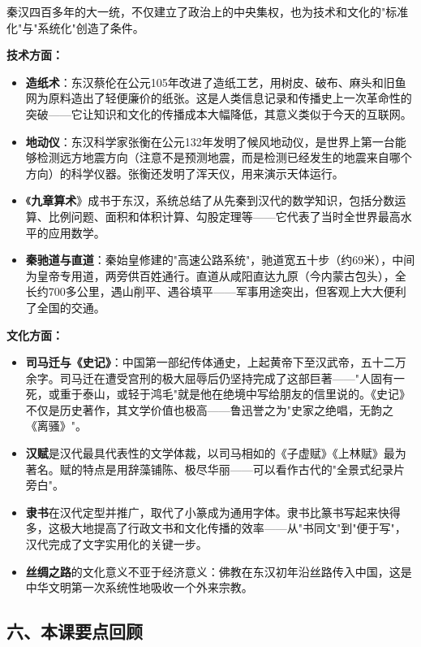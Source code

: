 \documentclass[a4paper,12pt]{ctexart}
\begin{document}
秦汉四百多年的大一统，不仅建立了政治上的中央集权，也为技术和文化的"标准化"与"系统化"创造了条件。

\textbf{技术方面：}
\begin{itemize}
  \item \textbf{造纸术}：东汉蔡伦在公元105年改进了造纸工艺，用树皮、破布、麻头和旧鱼网为原料造出了轻便廉价的纸张。这是人类信息记录和传播史上一次革命性的突破——它让知识和文化的传播成本大幅降低，其意义类似于今天的互联网。
  \item \textbf{地动仪}：东汉科学家张衡在公元132年发明了候风地动仪，是世界上第一台能够检测远方地震方向（注意\：不是预测地震，而是检测已经发生的地震来自哪个方向）的科学仪器。张衡还发明了浑天仪，用来演示天体运行。
  \item 《\textbf{九章算术}》成书于东汉，系统总结了从先秦到汉代的数学知识，包括分数运算、比例问题、面积和体积计算、勾股定理等——它代表了当时全世界最高水平的应用数学。
  \item \textbf{秦驰道与直道}：秦始皇修建的"高速公路系统"，驰道宽五十步（约69米），中间为皇帝专用道，两旁供百姓通行。直道从咸阳直达九原（今内蒙古包头），全长约700多公里，遇山削平、遇谷填平——军事用途突出，但客观上大大便利了全国的交通。
\end{itemize}

\textbf{文化方面：}
\begin{itemize}
  \item \textbf{司马迁与《史记》}：中国第一部纪传体通史，上起黄帝下至汉武帝，五十二万余字。司马迁在遭受宫刑的极大屈辱后仍坚持完成了这部巨著——"人固有一死，或重于泰山，或轻于鸿毛"就是他在绝境中写给朋友的信里说的。《史记》不仅是历史著作，其文学价值也极高——鲁迅誉之为"史家之绝唱，无韵之《离骚》"。
  \item \textbf{汉赋}是汉代最具代表性的文学体裁，以司马相如的《子虚赋》《上林赋》最为著名。赋的特点是用辞藻铺陈、极尽华丽——可以看作古代的"全景式纪录片旁白"。
  \item \textbf{隶书}在汉代定型并推广，取代了小篆成为通用字体。隶书比篆书写起来快得多，这极大地提高了行政文书和文化传播的效率——从"书同文"到"便于写"，汉代完成了文字实用化的关键一步。
  \item \textbf{丝绸之路}的文化意义不亚于经济意义：佛教在东汉初年沿丝路传入中国，这是中华文明第一次系统性地吸收一个外来宗教。
\end{itemize}

\subsection*{六、本课要点回顾}
\end{document}
